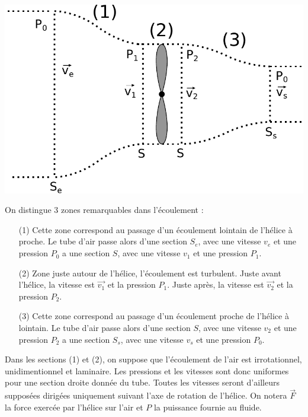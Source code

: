 \documentclass{report}
\begin{document}
\begin{center}
	\includegraphics[scale=0.5]{meca_flu6.pdf}
\end{center}

On distingue 3 zones remarquables dans l'écoulement :
\begin{itemize}
	\item[(1) ] Cette zone correspond au passage d'un écoulement lointain de l'hélice à proche. Le tube d'air passe alors d'une section $S_e$, avec une vitesse $v_e$ et une pression $P_0$ a une section $S$, avec une vitesse $v_1$ et une pression $P_1$.
	\item[(2) ] Zone juste autour de l'hélice, l'écoulement est turbulent. Juste avant l'hélice, la vitesse est $\vec{v_1}$ et la pression $P_1$. Juste après, la vitesse est $\vec{v_2}$ et la pression $P_2$.
	\item[(3) ] Cette zone correspond au passage d'un écoulement proche de l'hélice à lointain. Le tube d'air passe alors d'une section $S$, avec une vitesse $v_2$ et une pression $P_2$ a une section $S_s$, avec une vitesse $v_s$ et une pression $P_0$.
\end{itemize}
Dans les sections (1) et (2), on suppose que l'écoulement de l'air est irrotationnel, unidimentionnel et laminaire. Les pressions et les vitesses sont donc uniformes pour une section droite donnée du tube. Toutes les vitesses seront d'ailleurs supposées dirigées uniquement suivant l'axe de rotation de l'hélice. 
On notera $\vec{F}$ la force exercée par l'hélice sur l'air et $P$ la puissance fournie au fluide.
\end{document}
